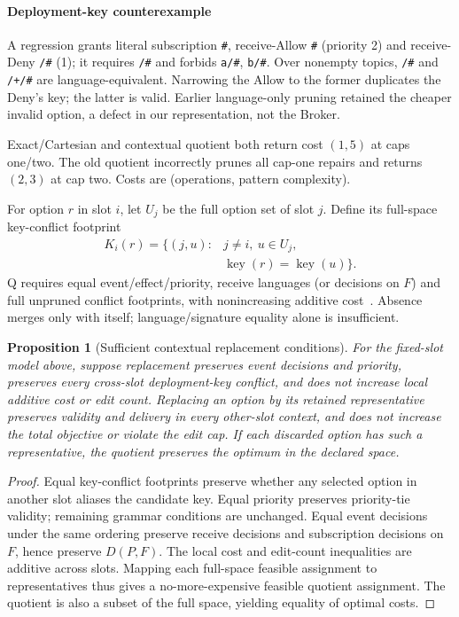 \documentclass[letterpaper,journal]{IEEEtran}
\newtheorem{proposition}{Proposition}
\begin{document}
\paragraph{Deployment-key counterexample}
A regression grants literal subscription \texttt{\#}, receive-Allow \texttt{\#} (priority 2) and receive-Deny \texttt{/\#} (1); it requires \texttt{/\#} and forbids \texttt{a/\#}, \texttt{b/\#}. Over nonempty topics, \texttt{/\#} and \texttt{/+/\#} are language-equivalent. Narrowing the Allow to the former duplicates the Deny's key; the latter is valid. Earlier language-only pruning retained the cheaper invalid option, a defect in our representation, not the Broker.

Exact/Cartesian and contextual quotient both return cost $(1,5)$ at caps one/two. The old quotient incorrectly prunes all cap-one repairs and returns $(2,3)$ at cap two. Costs are (operations, pattern complexity).


For option $r$ in slot $i$, let $U_j$ be the full option set of slot $j$. Define its full-space key-conflict footprint
\begin{equation}\begin{aligned}
 K_i(r)=\{(j,u): {}&j\ne i,\ u\in U_j,\\
 &\operatorname{key}(r)=\operatorname{key}(u)\}.
\end{aligned}\end{equation}
Q requires equal event/effect/priority, receive languages (or decisions on $F$) and full unpruned conflict footprints, with nonincreasing additive cost~\cite{moito}. Absence merges only with itself; language/signature equality alone is insufficient.

\begin{proposition}[Sufficient contextual replacement conditions]
For the fixed-slot model above, suppose replacement preserves event decisions and priority, preserves every cross-slot deployment-key conflict, and does not increase local additive cost or edit count. Replacing an option by its retained representative preserves validity and delivery in every other-slot context, and does not increase the total objective or violate the edit cap. If each discarded option has such a representative, the quotient preserves the optimum in the declared space.
\end{proposition}
\begin{proof}
Equal key-conflict footprints preserve whether any selected option in another slot aliases the candidate key. Equal priority preserves priority-tie validity; remaining grammar conditions are unchanged. Equal event decisions under the same ordering preserve receive decisions and subscription decisions on $F$, hence preserve $D(P,F)$. The local cost and edit-count inequalities are additive across slots. Mapping each full-space feasible assignment to representatives thus gives a no-more-expensive feasible quotient assignment. The quotient is also a subset of the full space, yielding equality of optimal costs.
\end{proof}
\end{document}
